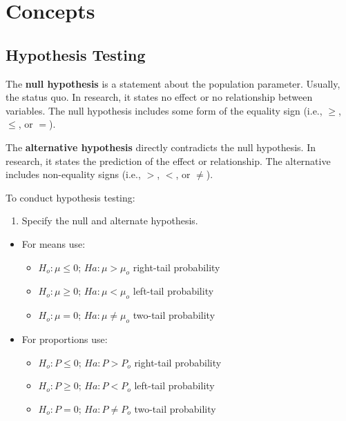 \documentclass[
  letterpaper,
  DIV=11,
  numbers=noendperiod]{scrreprt}
\providecommand{\tightlist}{%
  \setlength{\itemsep}{0pt}\setlength{\parskip}{0pt}}\usepackage{longtable,booktabs,array}
\begin{document}
\hypertarget{concepts-12}{%
\section{Concepts}\label{concepts-12}}

\hypertarget{hypothesis-testing}{%
\subsection*{Hypothesis Testing}\label{hypothesis-testing}}

The \textbf{null hypothesis} is a statement about the population
parameter. Usually, the status quo. In research, it states no effect or
no relationship between variables. The null hypothesis includes some
form of the equality sign (i.e., \(\geq\), \(\leq\), or \(=\)).

The \textbf{alternative hypothesis} directly contradicts the null
hypothesis. In research, it states the prediction of the effect or
relationship. The alternative includes non-equality signs (i.e., \(>\),
\(<\), or \(\ne\)).

To conduct hypothesis testing:

\begin{enumerate}
\def\labelenumi{\arabic{enumi}.}
\tightlist
\item
  Specify the null and alternate hypothesis.
\end{enumerate}

\begin{itemize}
\item
  For means use:

  \begin{itemize}
  \item
    \(H_o: \mu \leq 0\); \(Ha: \mu > \mu_o\) right-tail probability
  \item
    \(H_o: \mu \geq 0\); \(Ha: \mu < \mu_o\) left-tail probability
  \item
    \(H_o: \mu = 0\); \(Ha: \mu \ne \mu_o\) two-tail probability
  \end{itemize}
\item
  For proportions use:

  \begin{itemize}
  \item
    \(H_o: P \leq 0\); \(Ha: P > P_o\) right-tail probability
  \item
    \(H_o: P \geq 0\); \(Ha: P < P_o\) left-tail probability
  \item
    \(H_o: P = 0\); \(Ha: P \ne P_o\) two-tail probability
  \end{itemize}
\end{itemize}
\end{document}
